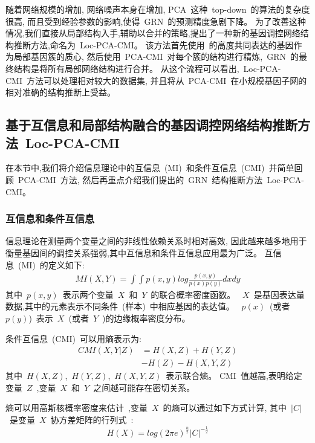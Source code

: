 随着网络规模的增加, 网络噪声本身在增加,
PCA~这种~top-down~的算法的复杂度很高, 而且受到经验参数的影响,使得~GRN~的预测精度急剧下降。
为了改善这种情况,我们直接从局部结构入手,辅助以合并的策略,提出了一种新的基因调控网络结构推断方法,命名为~Loc-PCA-CMI。
该方法首先使用~的高度共同表达的基因作为局部基因簇的质心,
然后使用~PCA-CMI~对每个簇的结构进行精炼,~GRN~的最终结构是将所有局部网络结构进行合并。
从这个流程可以看出,~Loc-PCA-CMI~方法可以处理相对较大的数据集,
并且将从~PCA-CMI~在小规模基因子网的相对准确的结构推断上受益。

\subsection{基于互信息和局部结构融合的基因调控网络结构推断方法~Loc-PCA-CMI}
在本节中,我们将介绍信息理论中的互信息~(MI)~和条件互信息~(CMI)~并简单回顾~PCA-CMI~方法,
然后再重点介绍我们提出的~GRN~结构推断方法~Loc-PCA-CMI。

\subsubsection{互信息和条件互信息}
\label{relatedwork}
信息理论在测量两个变量之间的非线性依赖关系时相对高效, 
因此越来越多地用于衡量基因间的调控关系强弱,其中互信息和条件互信息应用最为广泛。
互信息~(MI)~的定义如下:
\begin{align} %
    MI(X,Y)=\int \int p(x,y)log \frac{p(x,y)}{p(x)p(y)}dxdy
 \end{align}
 其中~$p(x,y)$~表示两个变量~$X$~和~$Y$~的联合概率密度函数。
~$X$~是基因表达量数据,其中的元素表示不同条件~(样本)~中相应基因的表达值。
~$p(x)$~(或者~$p(y)$)~表示~$X$~(或者~$Y$~)的边缘概率密度分布。

条件互信息~(CMI)~可以用熵表示为:
\begin{equation}
\begin{split}
CMI(X,Y|Z) &= H(X,Z) + H(Y,Z)\\
               & - H(Z) - H(X,Y,Z)
\end{split}
\end{equation}
其中~$H(X,Z)$,~$H(Y,Z)$,~$H(X,Y,Z)$~表示联合熵。
CMI~值越高,表明给定变量~$Z$~,变量~$X$~和~$Y$~之间越可能存在密切关系。

熵可以用高斯核概率密度来估计~\cite{basso2005reverse},变量~$X$~的熵可以通过如下方式计算, 
其中~$|C|$~是变量~$X$~协方差矩阵的行列式~\cite{zhang2011inferring}:
\begin{equation}
    H(X) = log(2\pi e )^\frac{n}{2} |C| ^ {-\frac{1}{2}}
\end{equation}

